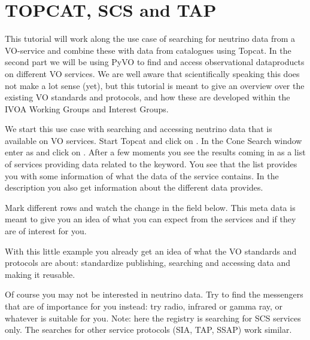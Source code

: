 \documentclass[twoside]{article}[12pt]
\begin{document}
\section {TOPCAT, SCS and TAP}
This tutorial will work along the use case of searching for neutrino
data from a VO-service and combine these with data from catalogues using
Topcat. In the second part we will be using PyVO to find and access
observational dataproducts on different VO services.
We are well aware that scientifically speaking this does not make a lot
sense (yet), but this tutorial is meant to give an overview over the
existing VO standards and protocols, and how these are developed within
the IVOA Working Groups and Interest Groups. 



We start this use case with searching and accessing neutrino data
that is available on VO services. Start Topcat and click on
\goto {}. In the Cone Search window enter
 as  and click on .
After a few moments you see the results coming in as a list of services
providing data related to the keyword. You see that the list provides
you with some information of what the data of the service contains. In
the description you also get information about the different data
provides.

\REGISTRYSTD

Mark different rows and watch the  change in the field below. This meta data is meant to give you an idea of what you can expect from the services and if they are of
interest for you.

With this little example you already get an idea of what the VO
standards and protocols are about: standardize publishing, searching and
accessing data and making it reusable. 


\begin{exercise}Of course you may not be interested in neutrino data.
Try to find the messengers that are of importance for you instead: try radio,
infrared or gamma ray, or whatever is suitable for you. Note: here the
registry is searching for SCS services only. The searches for other
service protocols (SIA, TAP, SSAP) work similar. 
\end{exercise}

\end{document}
